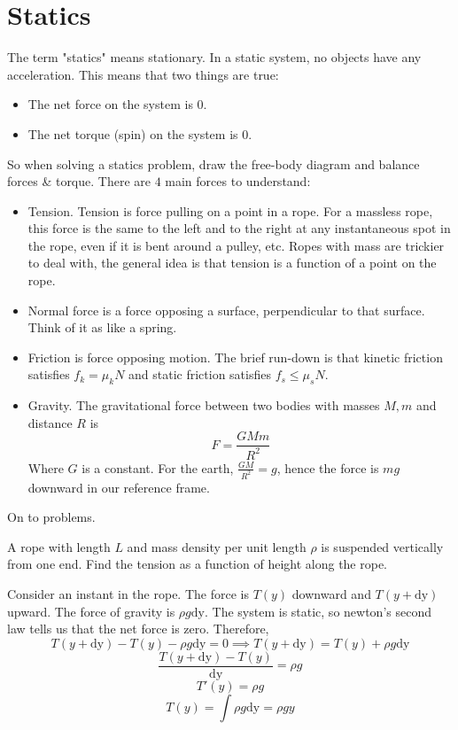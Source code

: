 \documentclass[11pt]{scrartcl}
\newcommand{\ca}[1]{\mathrm{#1}}
\begin{document}
\section{Statics}
The term "statics" means stationary. In a static system, no objects have any acceleration.
This means that two things are true:
\begin{itemize}
  \item The net force on the system is $0$.
  \item The net torque (spin) on the system is $0$.
\end{itemize}
So when solving a statics problem, draw the free-body diagram and balance forces \& torque.
There are $4$ main forces to understand:
\begin{itemize}
  \item Tension. Tension is force pulling on a point in a rope. For a massless rope, this force is the same to the left and to the right
    at any instantaneous spot in the rope, even if it is bent around a pulley, etc. Ropes with mass are trickier to deal with, the general
    idea is that tension is a function of a point on the rope.
  \item Normal force is a force opposing a surface, perpendicular to that surface. Think of it as like a spring.
  \item Friction is force opposing motion. The brief run-down is that kinetic friction satisfies $f_k=\mu_k N$ and static friction satisfies
    $f_s\le \mu_s N$.
  \item Gravity. The gravitational force between two bodies with masses $M,m$ and distance $R$ is
    $$F=\frac{GMm}{R^2}$$
    Where $G$ is a constant. For the earth, $\frac{GM}{R^2}=g$, hence the force is $mg$ downward in our reference frame.
\end{itemize}
On to problems.
\begin{example}
  A rope with length $L$ and mass density per unit length $\rho$ is suspended
  vertically from one end. Find the tension as a function of height along the rope.
\end{example}
\begin{soln}
  Consider an instant in the rope. The force is $T(y)$ downward and
  $T(y+\ca{dy})$ upward. The force of gravity is $\rho g\ca{dy}$. The system is static,
  so newton's second law tells us that the net force is zero. Therefore,
  $$T(y+\ca{dy})-T(y)-\rho g\ca{dy}=0 \implies T(y+\ca{dy})=T(y)+\rho g\ca{dy}$$
  $$\frac{T(y+\ca{dy})-T(y)}{\ca{dy}}=\rho g$$
  $$T'(y)=\rho g$$
  $$T(y)=\int \rho g \ca{dy}=\rho g y$$
\end{soln}
\end{document}
